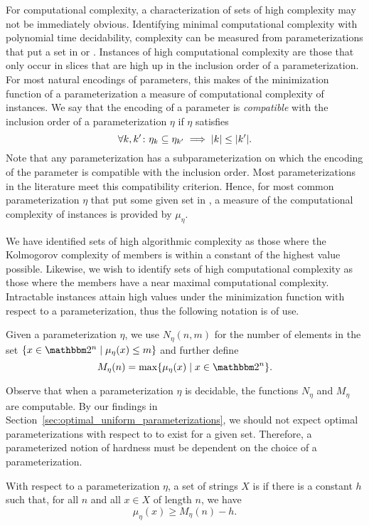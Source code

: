 For computational complexity, a characterization of sets of high complexity may not be immediately obvious.
Identifying minimal computational complexity with polynomial time decidability, complexity can be measured from parameterizations that put a set in  or .
Instances of high computational complexity are those that only occur in slices that are high up in the inclusion order of a parameterization.
For most natural encodings of parameters, this makes of the minimization function of a parameterization a measure of computational complexity of instances.
We say that the encoding of a parameter is \emph{compatible} with the inclusion order of a parameterization $\eta$ if $\eta$ satisfies
\begin{equation*}
  \forall k, k'\colon \eta_k \subseteq \eta_{k'} \implies {\lvert k\rvert} \le {\lvert k'\rvert}.
\end{equation*}
Note that any parameterization has a subparameterization on which the encoding of the parameter is compatible with the inclusion order.
Most parameterizations in the literature \parencite[e.g.][]{downey1999parameterized,flum2006parameterized,niedermeier2006invitation,cygan2015parameterized} meet this compatibility criterion.
Hence, for most common parameterization $\eta$ that put some given set in , a measure of the computational complexity of instances is provided by $\mu_\eta$.

We have identified sets of high algorithmic complexity as those where the Kolmogorov complexity of members is within a constant of the highest value possible.
Likewise, we wish to identify sets of high computational complexity as those where the members have a near maximal computational complexity.
Intractable instances attain high values under the minimization function with respect to a parameterization, thus the following notation is of use.
\begin{definition}
  Given a parameterization $\eta$, we use $N_\eta(n, m)$ for the number of elements in the set $\{x \in \binary^n \st \mu_\eta(x) \le m\}$ and further define
  \begin{equation*}
    M_\eta(n) \deq \max\{\mu_\eta(x) \st x \in \binary^n\}.
  \end{equation*}
\end{definition}

Observe that when a parameterization $\eta$ is decidable, the functions $N_\eta$ and $M_\eta$ are computable.
By our findings in Section~\ref{sec:optimal_uniform_parameterizations}, we should not expect optimal parameterizations with respect to  to exist for a given set.
Therefore, a parameterized notion of hardness must be dependent on the choice of a parameterization.
\begin{definition}
  With respect to a parameterization $\eta$, a set of strings $X$ is  if there is a constant $h$ such that, for all $n$ and all $x \in X$ of length $n$, we have
  \begin{equation*}
    \mu_\eta(x) \ge M_\eta(n) - h.
  \end{equation*}
\end{definition}


